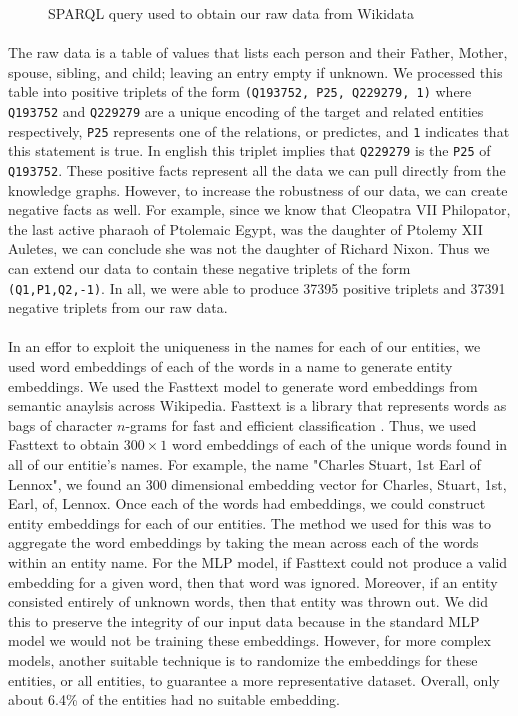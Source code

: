 \documentclass[11.5pt]{article}
\begin{document}
\begin{figure}[h!]
 
 \caption{\small SPARQL query used to obtain our raw data from Wikidata}
 \label{query}
\end{figure}


\paragraph{} The raw data is a table of values that lists each person and their Father, Mother, spouse, sibling, and child; leaving an entry empty if unknown. We processed this table into positive triplets of the form \texttt{(Q193752, P25, Q229279, 1)} where \texttt{Q193752} and \texttt{Q229279} are a unique encoding of the target and related entities respectively, \texttt{P25} represents one of the relations, or predictes, and \texttt{1} indicates that this statement is true. In english this triplet implies that \texttt{Q229279} is the \texttt{P25} of \texttt{Q193752}. These positive facts represent all the data we can pull directly from the knowledge graphs. However, to increase the robustness of our data, we can create negative facts as well. For example, since we know that Cleopatra VII Philopator, the last active pharaoh of Ptolemaic Egypt, was the daughter of Ptolemy XII Auletes, we can conclude she was not the daughter of Richard Nixon. Thus we can extend our data to contain these negative triplets of the form \texttt{(Q1,P1,Q2,-1)}. In all, we were able to produce 37395 positive triplets and 37391 negative triplets from our raw data. 

\paragraph{} In an effor to exploit the uniqueness in the names for each of our entities, we used word embeddings of each of the words in a name to generate entity embeddings. We used the Fasttext model to generate word embeddings from semantic anaylsis across Wikipedia. Fasttext is a library that represents words as bags of character $n$-grams for fast and efficient classification \cite{BojanowskiGJM16,JoulinGBM16}. Thus, we used Fasttext to obtain $300\times 1$ word embeddings of each of the unique words found in all of our entitie's names. For example, the name "Charles Stuart, 1st Earl of Lennox", we found an 300 dimensional embedding vector for Charles, Stuart, 1st, Earl, of, Lennox. Once each of the words had embeddings, we could construct entity embeddings for each of our entities. The method we used for this was to aggregate the word embeddings by taking the mean across each of the words within an entity name. For the MLP model, if Fasttext could not produce a valid embedding for a given word, then that word was ignored. Moreover, if an entity consisted entirely of unknown words, then that entity was thrown out. We did this to preserve the integrity of our input data because in the standard MLP model we would not be training these embeddings. However, for more complex models, another suitable technique is to randomize the embeddings for these entities, or all entities, to guarantee a more representative dataset. Overall, only about 6.4\% of the entities had no suitable embedding. 
\end{document}
